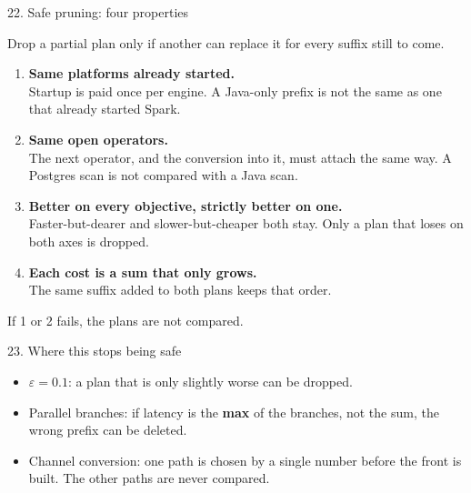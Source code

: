 \documentclass[aspectratio=169,11pt]{beamer}
\begin{document}
\begin{frame}{22. Safe pruning: four properties}

Drop a partial plan only if another can replace it for every suffix still to come.

\vspace{0.35cm}
\begin{enumerate}
\item \textbf{Same platforms already started.}\\
Startup is paid once per engine. A Java-only prefix is not the same as one that already started Spark.
\item \textbf{Same open operators.}\\
The next operator, and the conversion into it, must attach the same way. A Postgres scan is not compared with a Java scan.
\item \textbf{Better on every objective, strictly better on one.}\\
Faster-but-dearer and slower-but-cheaper both stay. Only a plan that loses on both axes is dropped.
\item \textbf{Each cost is a sum that only grows.}\\
The same suffix added to both plans keeps that order.
\end{enumerate}

\vspace{0.25cm}
{\small If 1 or 2 fails, the plans are not compared.}
\end{frame}

\begin{frame}{23. Where this stops being safe}

\begin{itemize}
\item \(\varepsilon = 0.1\): a plan that is only slightly worse can be dropped.
\item Parallel branches: if latency is the \textbf{max} of the branches, not the sum, the wrong prefix can be deleted.
\item Channel conversion: one path is chosen by a single number before the front is built. The other paths are never compared.
\end{itemize}
\end{frame}
\end{document}

